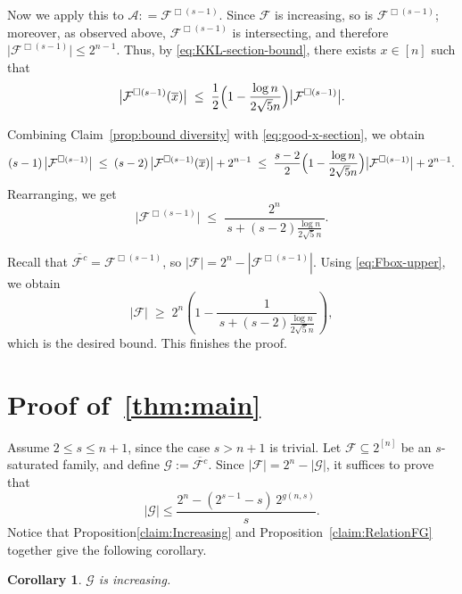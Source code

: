 \documentclass[11pt]{article}
\newtheorem{cor}[theorem]{Corollary}
\theoremstyle{definition}
\begin{document}
Now we apply this to
\(
   \mathcal{A}: = \mathcal{F}^{\Box(s-1)}.
\)
Since $\mathcal{F}$ is increasing, so is
$\mathcal{F}^{\Box(s-1)}$; moreover, as observed above,
$\mathcal{F}^{\Box(s-1)}$ is intersecting, and therefore
\(
   \bigl|\mathcal{F}^{\Box(s-1)}\bigr|\le 2^{n-1}.
\)
Thus, by \eqref{eq:KKL-section-bound}, there exists
$x\in[n]$ such that
\begin{equation}\label{eq:good-x-section}
   \bigl|\mathcal{F}^{\Box(s-1)}(\overline{x})\bigr|
   \;\le\;
   \frac{1}{2}\Bigl(1-\frac{\log n}{2\sqrt{5}n}\Bigr)
   \bigl|\mathcal{F}^{\Box(s-1)}\bigr|.
\end{equation}

Combining Claim~\ref{prop:bound diversity} with \eqref{eq:good-x-section},
we obtain
\[
   (s-1)\,\bigl|\mathcal{F}^{\Box(s-1)}\bigr|
   \;\le\;
   (s-2)\,\bigl|\mathcal{F}^{\Box(s-1)}(\overline{x})\bigr|
   + 2^{n-1}
   \;\le\;
   \frac{s-2}{2}\Bigl(1-\frac{\log n}{2\sqrt{5}n}\Bigr)
   \bigl|\mathcal{F}^{\Box(s-1)}\bigr|
   + 2^{n-1}.
\]
Rearranging, we get
\begin{equation}\label{eq:Fbox-upper}
   \bigl|\mathcal{F}^{\Box(s-1)}\bigr|
   \;\le\;
   \frac{2^n}{\,s + (s-2)\frac{\log n}{2\sqrt{5}n}\,}.
\end{equation}

Recall that
\(
   \overline{\mathcal{F}^{c}} = \mathcal{F}^{\Box(s-1)}
\),
so $|\mathcal{F}| = 2^n - |\mathcal{F}^{\Box(s-1)}|$.  Using
\eqref{eq:Fbox-upper}, we obtain
\[
   |\mathcal{F}|
   \;\ge\;
   2^n\left(
      1 - \frac{1}{\,s + (s-2)\frac{\log n}{2\sqrt{5}n}\,}
   \right),
\]
which is the desired bound. This finishes the proof.



\section{Proof of~\cref{thm:main}}
Assume \(2\le s\le n+1\), since the case \(s>n+1\) is trivial.
Let \(\mathcal{F}\subseteq 2^{[n]}\) be an \(s\)-saturated family, and define
\(
\mathcal{G}:=\overline{\mathcal{F}^c}.
\)
Since \(|\mathcal{F}|=2^n-|\mathcal{G}|\), it suffices to prove that
\begin{equation}\label{eq:G-upper-main}
|\mathcal{G}|
\le
\frac{2^{n}-(2^{s-1}-s)\,2^{g(n,s)}}{s}.
\end{equation}
Notice that Proposition\ref{claim:Increasing} and Proposition~\ref{claim:RelationFG} together give the following corollary.
\begin{cor}\label{Cor:IncrGG}
   \(\mathcal{G}\) is increasing.
\end{cor}
\end{document}
